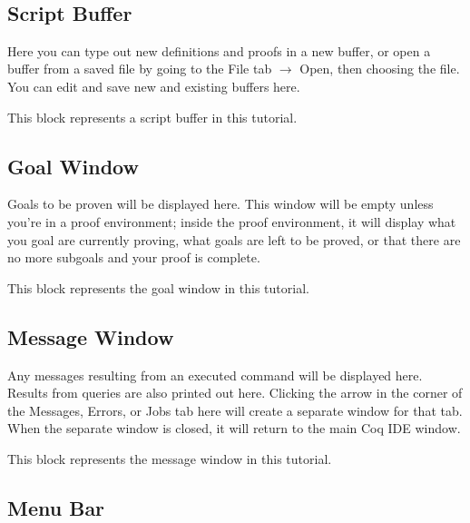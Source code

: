 



~\\







%	




\newpage
\subsection{Script Buffer}
Here you can type out new definitions and proofs in a new buffer, or open a buffer from a saved file by going to the File tab $\to$ Open, then choosing the file. 
You can edit and save new and existing buffers here. 
\begin{code} 
	This block represents a script buffer in this tutorial. 
\end{code}



\subsection{Goal Window}
Goals to be proven will be displayed here. 
This window will be empty unless you're in a proof environment; inside the proof environment, it will display what you goal are currently proving, what goals are left to be proved, or that there are no more subgoals and your proof is complete.
\begin{goal} 
	This block represents the goal window in this tutorial. 
\end{goal}



\subsection{Message Window}
Any messages resulting from an executed command will be displayed here. 
Results from queries are also printed out here. 
Clicking the arrow in the corner of the Messages, Errors, or Jobs tab here will create a separate window for that tab. 
When the separate window is closed, it will return to the main Coq IDE window. 
\begin{msg} 
	This block represents the message window in this tutorial. 
\end{msg}






\subsection{Menu Bar}








